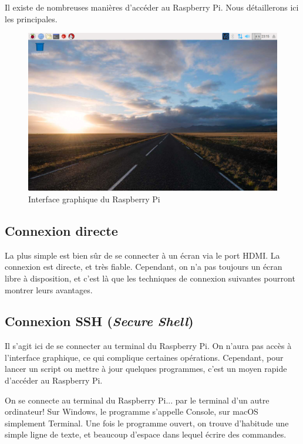 Il existe de nombreuses manières d'accéder au Raspberry Pi. Nous détaillerons ici les principales.

\begin{figure}[h!]
    \begin{center}
        \includegraphics[width=15cm]{img/raspi.png}
    \end{center}
    \caption{Interface graphique du Raspberry Pi}
    \label{interface}
\end{figure}

\subsection{Connexion directe}

La plus simple est bien sûr de se connecter à un écran via le port HDMI. La connexion est directe, et très fiable. Cependant, on n'a pas toujours un écran libre à disposition, et c'est là que les techniques de connexion suivantes pourront montrer leurs avantages.

\subsection{Connexion SSH (\textit{Secure Shell})}

Il s'agit ici de se connecter au terminal du Raspberry Pi. On n'aura pas accès à l'interface graphique, ce qui complique certaines opérations. Cependant, pour lancer un script ou mettre à jour quelques programmes, c'est un moyen rapide d'accéder au Raspberry Pi.

On se connecte au terminal du Raspberry Pi... par le terminal d'un autre ordinateur! Sur Windows, le programme s'appelle Console, sur macOS simplement Terminal. Une fois le programme ouvert, on trouve d'habitude une simple ligne de texte, et beaucoup d'espace dans lequel écrire des commandes.

